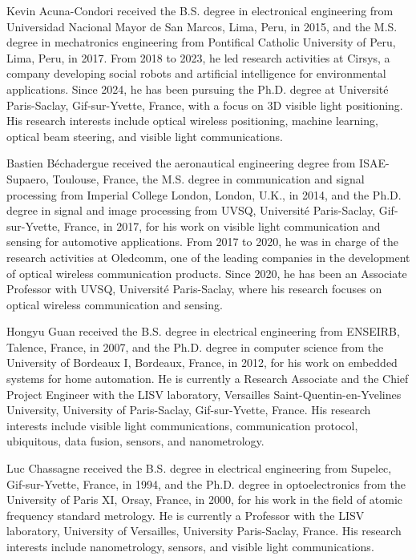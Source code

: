 \documentclass[journal]{IEEEtran}
\begin{document}
\begin{IEEEbiographynophoto}{Kevin Acuna-Condori}
received the B.S. degree in electronical engineering from Universidad Nacional Mayor de San Marcos, Lima, Peru, in 2015, and the M.S. degree in mechatronics engineering from Pontifical Catholic University of Peru, Lima, Peru, in 2017. 
From 2018 to 2023, he led research activities at Cirsys, a company developing social robots and artificial intelligence for environmental applications.
Since 2024, he has been pursuing the Ph.D. degree at Université Paris-Saclay, Gif-sur-Yvette, France, with a focus on 3D visible light positioning.
His research interests include optical wireless positioning, machine learning, optical beam steering, and visible light communications.
\end{IEEEbiographynophoto}

\begin{IEEEbiographynophoto}{Bastien Béchadergue}
received the aeronautical engineering degree from ISAE-Supaero, Toulouse, France, the M.S. degree in communication and signal processing from Imperial College London, London, U.K., in 2014, and the Ph.D. degree in signal and image processing from UVSQ, Université Paris-Saclay, Gif-sur-Yvette, France, in 2017, for his work on visible light communication and sensing for automotive applications. From 2017 to 2020, he was in charge of the research activities at Oledcomm, one of the leading companies in the development of optical wireless communication products. Since 2020, he has been an Associate Professor with UVSQ, Université Paris-Saclay, where his research focuses on optical wireless communication and sensing.
\end{IEEEbiographynophoto}

\begin{IEEEbiographynophoto}{Hongyu Guan}
received the B.S. degree in electrical engineering from ENSEIRB, Talence, France, in 2007, and the Ph.D. degree in computer science from the University of Bordeaux I, Bordeaux, France, in 2012, for his work on embedded systems for home automation. He is currently a Research Associate and the Chief Project Engineer with the LISV laboratory, Versailles Saint-Quentin-en-Yvelines University, University of Paris-Saclay, Gif-sur-Yvette, France. His research interests include visible light communications, communication protocol, ubiquitous, data fusion, sensors, and nanometrology.
\end{IEEEbiographynophoto}

\begin{IEEEbiographynophoto}{Luc Chassagne}
received the B.S. degree in electrical engineering from Supelec, Gif-sur-Yvette, France, in 1994, and the Ph.D. degree in optoelectronics from the University of Paris XI, Orsay, France, in 2000, for his work in the field of atomic frequency standard metrology. He is currently a Professor with the LISV laboratory, University of Versailles, University Paris-Saclay, France. His research interests include nanometrology, sensors, and visible light communications.
\end{IEEEbiographynophoto}
\end{document}
